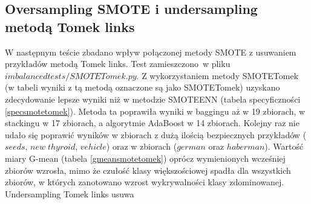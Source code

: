 \subsection{Oversampling SMOTE i undersampling metodą Tomek links}
W następnym teście zbadano wpływ połączonej metody SMOTE z usuwaniem przykładów metodą Tomek links. Test zamieszczono w pliku $imbalancedtests/SMOTETomek.py$. Z wykorzystaniem metody SMOTETomek (w tabeli wyniki z tą metodą oznaczone są jako SMOTETomek) uzyskano zdecydowanie lepsze wyniki niż w metodzie SMOTEENN (tabela specyficzności \ref{specsmotetomek}). Metoda ta poprawiła wyniki w baggingu aż w 19 zbiorach, w stackingu w 17 zbiorach, a algorytmie AdaBoost w 14 zbiorach. Kolejny raz nie udało się poprawić wyników w zbiorach z dużą ilością bezpiecznych przykładów ($seeds$, $new\; thyroid$, $vehicle$) oraz w zbiorach ($german$ oraz $haberman$). Wartość miary G-mean (tabela \ref{gmeansmotetomek}) oprócz wymienionych wcześniej zbiorów wzrosła, mimo że czułość klasy większościowej spadła dla wszystkich zbiorów, w których zanotowano wzrost wykrywalności klasy zdominowanej. Undersampling Tomek links usuwa 
